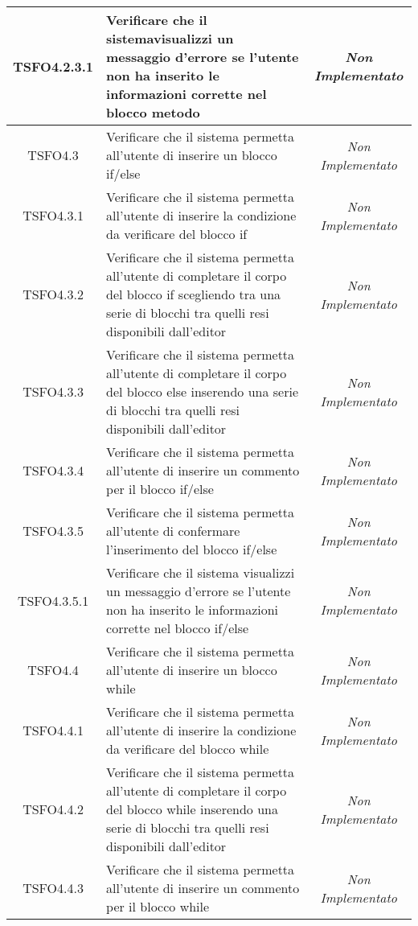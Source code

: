 \begin{longtable}{|c|>{}m{8cm}|c|}
\hypertarget{TSFO4.2.3.1}{TSFO4.2.3.1} & Verificare che il sistemavisualizzi un messaggio d'errore se l'utente non ha inserito le informazioni corrette nel blocco metodo  & \textit{Non Implementato}\\ \hline
\hypertarget{TSFO4.3}{TSFO4.3} & Verificare che il sistema permetta all'utente di inserire un blocco if/else & \textit{Non Implementato}\\ \hline
\hypertarget{TSFO4.3.1}{TSFO4.3.1} & Verificare che il sistema permetta all'utente di inserire la condizione da verificare del blocco if & \textit{Non Implementato}\\ \hline
\hypertarget{TSFO4.3.2}{TSFO4.3.2} & Verificare che il sistema permetta all'utente di completare il corpo del blocco if scegliendo tra una serie di blocchi tra quelli resi disponibili dall'editor & \textit{Non Implementato}\\ \hline
\hypertarget{TSFO4.3.3}{TSFO4.3.3} & Verificare che il sistema permetta all'utente di completare il corpo del blocco else inserendo una serie di blocchi tra quelli resi disponibili dall'editor & \textit{Non Implementato}\\ \hline
\hypertarget{TSFO4.3.4}{TSFO4.3.4} & Verificare che il sistema permetta all'utente di inserire un commento per il blocco if/else & \textit{Non Implementato}\\ \hline
\hypertarget{TSFO4.3.5}{TSFO4.3.5} & Verificare che il sistema permetta all'utente di confermare l'inserimento del blocco if/else & \textit{Non Implementato}\\ \hline
\hypertarget{TSFO4.3.5.1}{TSFO4.3.5.1} & Verificare che il sistema visualizzi un messaggio d'errore se l'utente non ha inserito le informazioni corrette nel blocco if/else & \textit{Non Implementato}\\ \hline
\hypertarget{TSFO4.4}{TSFO4.4} & Verificare che il sistema permetta all'utente di inserire un blocco while & \textit{Non Implementato}\\ \hline
\hypertarget{TSFO4.4.1}{TSFO4.4.1} & Verificare che il sistema permetta all'utente di inserire la condizione da verificare del blocco while & \textit{Non Implementato}\\ \hline
\hypertarget{TSFO4.4.2}{TSFO4.4.2} & Verificare che il sistema permetta all'utente di completare il corpo del blocco while inserendo una serie di blocchi tra quelli resi disponibili dall'editor & \textit{Non Implementato}\\ \hline
\hypertarget{TSFO4.4.3}{TSFO4.4.3} & Verificare che il sistema permetta all'utente di inserire un commento per il blocco while & \textit{Non Implementato}\\ \hline

\end{longtable}
